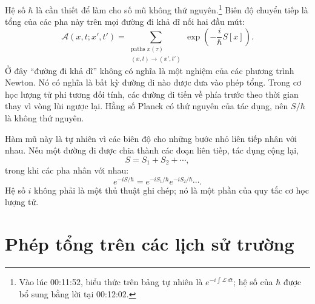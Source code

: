 Hệ số \(\hbar\) là cần thiết để làm cho số mũ không thứ nguyên.\footnote{Vào lúc 00:11:52, biểu thức trên bảng tự nhiên là \(e^{-i\int\mathcal{L}\,dt}\); hệ số của \(\hbar\) được bổ sung bằng lời tại 00:12:02.} Biên độ chuyển tiếp là tổng của các pha này trên mọi đường đi khả dĩ nối hai đầu mút:
\begin{equation}
\mathcal{A}(x,t;x',t')
=
\sum_{\substack{\text{paths }x(\tau)\\(x,t)\rightarrow(x',t')}}
\exp\!\left(-\frac{i}{\hbar}S[x]\right).
\end{equation}
Ở đây ``đường đi khả dĩ'' không có nghĩa là một nghiệm của các phương trình Newton. Nó có nghĩa là bất kỳ đường đi nào được đưa vào phép tổng. Trong cơ học lượng tử phi tương đối tính, các đường đi tiến về phía trước theo thời gian thay vì vòng lùi ngược lại. Hằng số Planck có thứ nguyên của tác dụng, nên \(S/\hbar\) là không thứ nguyên.

Hàm mũ này là tự nhiên vì các biên độ cho những bước nhỏ liên tiếp nhân với nhau. Nếu một đường đi được chia thành các đoạn liên tiếp, tác dụng cộng lại,
\begin{equation}
S=S_1+S_2+\cdots,
\end{equation}
trong khi các pha nhân với nhau:
\begin{equation}
e^{-iS/\hbar}
=e^{-iS_1/\hbar}e^{-iS_2/\hbar}\cdots.
\end{equation}
Hệ số \(i\) không phải là một thủ thuật ghi chép; nó là một phần của quy tắc cơ học lượng tử.

\begin{classroomqa}
\end{classroomqa}

\begin{classroomqa}
\end{classroomqa}

\section{Phép tổng trên các lịch sử trường}

